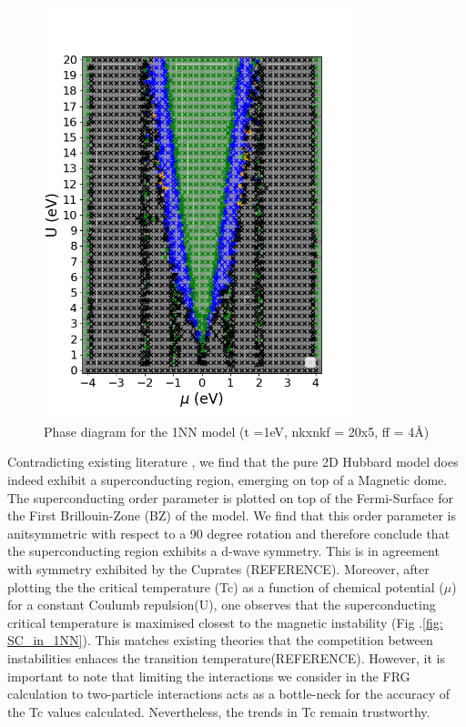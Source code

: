 \documentclass[12pt]{article}
\begin{document}
\begin{figure}[htbp]  %
    \centering
    \includegraphics[width=0.8\textwidth]{1NNpd.png}  %
    \caption{Phase diagram for the 1NN model (t =1eV, nkxnkf = 20x5, ff = 4\AA) }
    \label{fig:1NNpd}
\end{figure}



\noindent Contradicting existing literature \cite{qin2020absence}, we find that the pure 2D Hubbard model does indeed exhibit a superconducting region, emerging on top of a Magnetic dome. 
The superconducting order parameter is plotted on top of the Fermi-Surface for the
First Brillouin-Zone (BZ) of the model.
We find that this order parameter is anitsymmetric with respect to a 90 degree rotation and therefore conclude 
that the superconducting region exhibits a d-wave symmetry. This is in agreement with symmetry exhibited by the Cuprates (REFERENCE). Moreover, after plotting the the critical temperature (Tc) as a function of chemical potential ($\mu$) for a constant Coulumb repulsion(U), one observes that
the superconducting critical temperature is maximised closest to the magnetic instability (Fig .\ref{fig: SC_in_1NN}). This matches existing theories that the competition between instabilities enhaces the transition temperature(REFERENCE).
However, it is important to note that limiting the interactions we consider in the FRG calculation to two-particle interactions acts as a bottle-neck for the accuracy of the Tc values calculated. Nevertheless, the trends in Tc remain trustworthy. 
\end{document}
